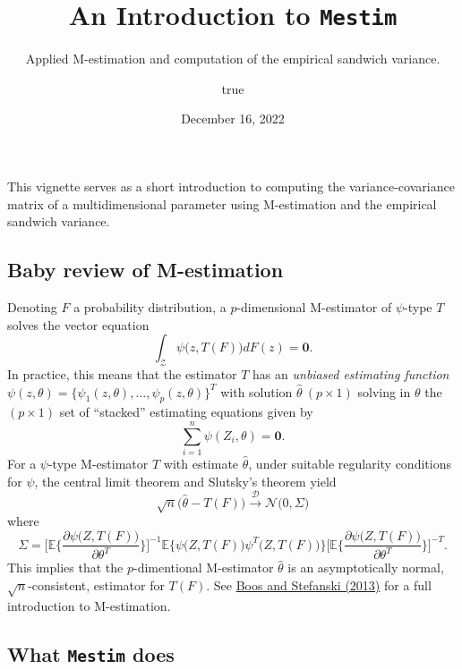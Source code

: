 \documentclass[
]{article}
\title{An Introduction to \texttt{Mestim}}
\subtitle{Applied M-estimation and computation of the empirical sandwich
variance.}
\author{true}
\date{December 16, 2022}
\begin{document}
\maketitle

{
\setcounter{tocdepth}{2}
\tableofcontents
}
This vignette serves as a short introduction to computing the
variance-covariance matrix of a multidimensional parameter using
M-estimation and the empirical sandwich variance.

\hypertarget{baby-review-of-m-estimation}{%
\subsection{Baby review of
M-estimation}\label{baby-review-of-m-estimation}}

Denoting \(F\) a probability distribution, a \(p\)-dimensional
M-estimator of \(\psi\)-type \(T\) solves the vector equation
\[\int_\mathcal{Z}\psi\big(z, T(F)\big)dF(z)=\boldsymbol{0}.\] In
practice, this means that the estimator \(T\) has an \emph{unbiased
estimating function}
\(\psi(z,\theta)=\{\psi_1(z,\theta), \ldots, \psi_p(z,\theta)\}^T\) with
solution \(\hat{\theta}~(p\times 1)\) solving in \(\theta\) the
\((p\times 1)\) set of ``stacked'' estimating equations given by
\[ \sum_{i=1}^{n}\psi(Z_i,\theta)=\boldsymbol{0}.\] For a \(\psi\)-type
M-estimator \(T\) with estimate \(\hat{\theta}\), under suitable
regularity conditions for \(\psi\), the central limit theorem and
Slutsky's theorem yield
\[\sqrt{n}\big(\hat{\theta}-T(F)\big)\xrightarrow{\mathcal{D}}\mathcal{N}\big(0, \Sigma)\]
where
\[\Sigma=\Bigg[\mathbb{E}\bigg\{\frac{\partial \psi\big(Z,T(F)\big) }{\partial\theta^T}\bigg\}\Bigg]^{-1}\mathbb{E}\Big\{ \psi\big(Z,T(F)\big) \psi^T\big(Z,T(F)\big)\Big\}\Bigg[\mathbb{E}\bigg\{\frac{\partial \psi\big(Z,T(F)\big) }{\partial\theta^T}\bigg\}\Bigg]^{-T}.\]
This implies that the \(p\)-dimentional M-estimator \(\hat{\theta}\) is
an asymptotically normal, \(\sqrt{n}\)-consistent, estimator for
\(T(F)\). See
\href{http://ndl.ethernet.edu.et/bitstream/123456789/61932/1/265.pdf}{Boos
and Stefanski (2013)} for a full introduction to M-estimation.

\hypertarget{what-mestim-does}{%
\subsection{\texorpdfstring{What \texttt{Mestim}
does}{What Mestim does}}\label{what-mestim-does}}
\end{document}
